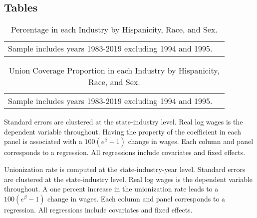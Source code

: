 \documentclass[11pt]{article}
\begin{document}
\singlespacing
\pagebreak

\nocite{*}


\pagebreak
\appendix
\begin{landscape}
\section*{Tables}
\small{}
\end{landscape}

\pagebreak
\begin{landscape}
\small{\begin{table}[h!]
    \centering
    \caption{Percentage in each Industry by Hispanicity, Race, and Sex.}\label{tab:nindtab}
\begin{tabular}{l*{8}{c}}

\hline\hline
\multicolumn{8}{l}{\footnotesize Sample includes years 1983-2019 excluding 1994 and 1995.}\\
\end{tabular}
\end{table}}
\end{landscape}

\pagebreak
\begin{landscape}
\small{\begin{table}[h!]
    \centering
    \caption{Union Coverage Proportion in each Industry by Hispanicity, Race, and Sex.}\label{tab:unindtab}
\begin{tabular}{l*{8}{c}}

\hline\hline
\multicolumn{8}{l}{\footnotesize Sample includes years 1983-2019 excluding 1994 and 1995.}\\
\end{tabular}
\end{table}}
\end{landscape}

\pagebreak
\small{}
\footnotesize{Standard errors are clustered at the state-industry level. Real log wages is the dependent variable throughout. Having the property of the coefficient in each panel is associated with a $ 100(e^\beta - 1) $ change in wages. Each column and panel corresponds to a regression. All regressions include covariates and fixed effects.}

\pagebreak
\small{}
\footnotesize{Unionization rate is computed at the state-industry-year level. Standard errors are clustered at the state-industry level. Real log wages is the dependent variable throughout. A one percent increase in the unionization rate leads to a $100(e^{\beta} - 1)$ change in wages. Each column and panel corresponds to a regression. All regressions include covariates and fixed effects.}
\end{document}
